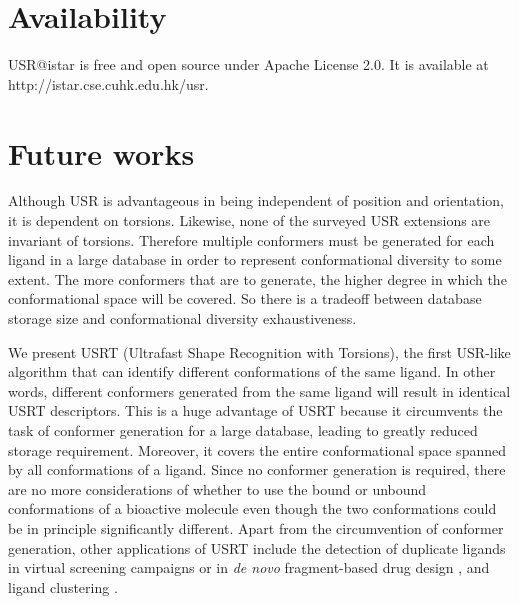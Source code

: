 \section{Availability}

USR@istar is free and open source under Apache License 2.0. It is available at http://istar.cse.cuhk.edu.hk/usr.

\section{Future works}

Although USR is advantageous in being independent of position and orientation, it is dependent on torsions. Likewise, none of the surveyed USR extensions are invariant of torsions. Therefore multiple conformers must be generated for each ligand in a large database in order to represent conformational diversity to some extent. The more conformers that are to generate, the higher degree in which the conformational space will be covered. So there is a tradeoff between database storage size and conformational diversity exhaustiveness.

We present USRT (Ultrafast Shape Recognition with Torsions), the first USR-like algorithm that can identify different conformations of the same ligand. In other words, different conformers generated from the same ligand will result in identical USRT descriptors. This is a huge advantage of USRT because it circumvents the task of conformer generation for a large database, leading to greatly reduced storage requirement. Moreover, it covers the entire conformational space spanned by all conformations of a ligand. Since no conformer generation is required, there are no more considerations of whether to use the bound or unbound conformations of a bioactive molecule even though the two conformations could be in principle significantly different. Apart from the circumvention of conformer generation, other applications of USRT include the detection of duplicate ligands in virtual screening campaigns \citep{1390} or in \textit{de novo} fragment-based drug design \citep{1409,1387}, and ligand clustering \citep{1280,1332}.

